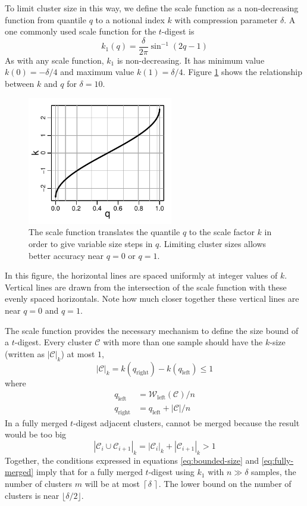 \documentclass[]{statsoc}
\begin{document}
To limit cluster size in this way, we define the scale function as a non-decreasing function from quantile $q$ to a notional index $k$ with compression parameter $\delta$. A one commonly used  scale function for the $t$-digest is 
\begin{equation}
k_1(q) = \frac \delta {2\pi}  { {\sin^{-1} (2q-1)} }    
\end{equation}
As with any scale function, $k_1$ is non-decreasing. It has minimum value  $k(0)=-\delta/4$ and maximum value  $k(1)=\delta/4$.  Figure \ref{fig:k-q-plot} shows the relationship between $k$ and $q$ for $\delta=10$. 
\begin{figure}[htbp] %
   \centering
   \includegraphics[width=2.5in]{k-q-plot.pdf} 
   \caption{The scale function translates the quantile $q$ to the scale factor $k$ in order to give variable size steps in $q$. Limiting cluster sizes allows better accuracy near $q=0$ or $q=1$. }
   \label{fig:k-q-plot}
\end{figure}
In this figure, the horizontal lines are spaced uniformly at integer values of $k$. Vertical lines are drawn from the intersection of the scale function with these evenly spaced horizontals. Note how much closer together these vertical lines are near $q=0$ and $q=1$.

The scale function provides the necessary mechanism to define the size bound of a $t$-digest. Every cluster $\mathcal C$ with more than one sample should have the $k$-size (written as $|\mathcal C|_k$) at most $1$,
\begin{equation}
\label{eq:bounded-size}
|\mathcal C|_k = k \left (q_{\mathrm {right}} \right) - k \left ( q_{\mathrm {left}} \right) \le 1
\end{equation}
where
\begin{align*}
q_{\mathrm {left}} &= {\mathcal W}_{\mathrm{left}}(\mathcal C)/n \\
q_{\mathrm {right}} &= q_{\mathrm {left}} + {| \mathcal C | / n} 
\end{align*}
In a fully merged $t$-digest adjacent clusters, cannot be merged because the result would be too big 
\begin{equation}
\label{eq:fully-merged}
|\mathcal C_i \cup \mathcal C_{i+1} |_k = |\mathcal C_i|_k + |\mathcal C_{i+1}|_k > 1
\end{equation}
Together, the conditions expressed in equations \ref{eq:bounded-size} and \ref{eq:fully-merged} imply that for a fully merged $t$-digest using $k_1$ with $n \gg \delta$ samples, the number of clusters $m$ will be at most $ \left \lceil\delta \,\right \rceil $.  The lower bound  on the number of clusters is near $ \lfloor\delta/2\rfloor $.
\end{document}
